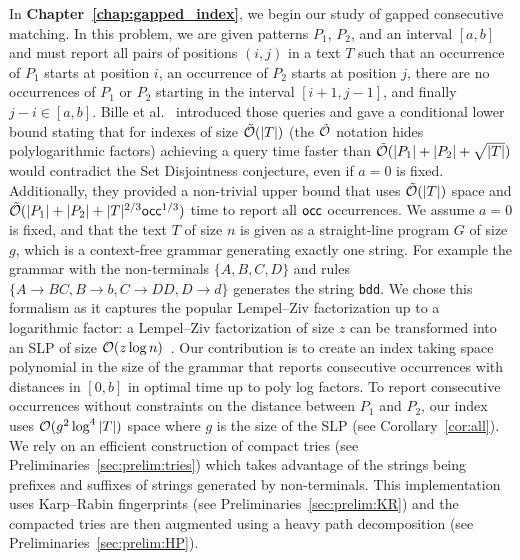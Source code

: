 In \textbf{Chapter~\ref{chap:gapped_index}}, we begin our study of gapped consecutive matching. In this problem, we are given patterns $P_1$, $P_2$, and an interval $[a,b]$ and must report all pairs of positions $(i,j)$ in a text $T$ such that an occurrence of $P_1$ starts at position $i$, an occurrence of $P_2$ starts at position $j$, there are no occurrences of $P_1$ or $P_2$ starting in the interval $[i+1,j-1]$, and finally $j-i \in [a,b]$.
Bille et al.~\cite{bille2022gapped} introduced those queries and gave a conditional lower bound stating that for indexes of size $\tilde {\mathcal{O}}(|T|)$ (the $\tilde {\mathcal{O}}$ notation hides polylogarithmic factors) achieving a query time faster than $\tilde {\mathcal{O}}(|P_1|+|P_2|+\sqrt{|T|})$ would contradict the Set Disjointness conjecture, even if $a=0$ is fixed. Additionally, they provided a non-trivial upper bound that uses $\tilde {\mathcal{O}}(|T|)$ space and $\tilde {\mathcal{O}} (|P_1| +|P_2| + |T|^{2/3}\mathsf{occ}^{1/3})$ time to report all $\mathsf{occ}$ occurrences. 
We assume $a=0$ is fixed, and that the text $T$ of size $n$ is given as a straight-line program $G$ of size $g$, which is a context-free grammar generating exactly one string. For example the grammar with the non-terminals $\{A,B,C,D\}$ and rules $\{A \rightarrow BC, B \rightarrow b, C \rightarrow DD, D\rightarrow d \}$ generates the string \texttt{bdd}.
We chose this formalism 
as it captures the popular Lempel--Ziv factorization up to a logarithmic factor: a Lempel--Ziv factorization of size $z$ can be transformed into an SLP of size $\mathcal{O}(z\log n)$~\cite{CharikarLLPPRSS02,Rytter02}.
%
Our contribution is to create an index taking space polynomial in the size of the grammar that reports consecutive occurrences with distances in $[0,b]$ in optimal time up to poly log factors.
To report consecutive occurrences without constraints on the distance between $P_1$ and $P_2$, our index uses $\mathcal{O}(g^2\log^4|T|)$ space where $g$ is the size of the SLP (see Corollary~\ref{cor:all}).
We rely on an efficient construction of compact tries (see Preliminaries~\ref{sec:prelim:tries}) which takes advantage of the strings being prefixes and suffixes of strings generated by non-terminals. This implementation uses Karp--Rabin fingerprints (see Preliminaries~\ref{sec:prelim:KR}) and the compacted tries are then augmented using a heavy path decomposition (see Preliminaries~\ref{sec:prelim:HP}).
